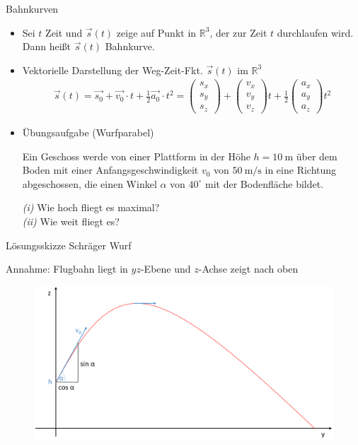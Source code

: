 \documentclass{beamer}
\begin{document}
\begin{frame}{Bahnkurven}
  \begin{itemize}
    
    \item Sei $t$ Zeit und $\vec{s} (t)$ zeige auf Punkt in $\mathbb{R}^3$, der zur Zeit $t$
    durchlaufen wird. Dann heißt $\vec{s} (t)$ Bahnkurve.
    
    \item  Vektorielle Darstellung der Weg-Zeit-Fkt. $\vec{s} (t)$ im $\mathbb{R}^3$
    \begin{align}
    \vec{s} (t) = \vec{s_0} + \vec{v_0} \cdot t + \frac{1}{2} \vec{a_0} \cdot t^2 =
           \begin{pmatrix} s_x \\ s_y \\ s_z \end{pmatrix} + \begin{pmatrix} v_x \\ v_y \\ v_z \end{pmatrix} t + 
           \frac{1}{2} \begin{pmatrix} a_x \\ a_y \\ a_z \end{pmatrix} t^2
    \end{align}
    
    \item Übungsaufgabe (Wurfparabel)
    
    Ein Geschoss werde von einer Plattform in der Höhe $h = \SI{10}{\meter}$ über dem Boden mit einer Anfangsgeschwindigkeit 
    $v_0$ von $\SI{50}{\meter\per\second}$ in eine Richtung abgeschossen, die einen Winkel $\alpha$ von $40^{\circ}$
    mit der Bodenfläche bildet.
    
    \emph{(i)} Wie hoch fliegt es maximal? \\
    \emph{(ii)} Wie weit fliegt es?
  \end{itemize}
    
\end{frame}

\begin{frame}{Lösungsskizze Schräger Wurf}

    Annahme: Flugbahn liegt in $yz$-Ebene und $z$-Achse zeigt nach oben
    \begin{figure}[ht]
        \centering
            \includegraphics[width=1.0\textwidth]{flugbahn}
    \end{figure}

\end{frame}
\end{document}
